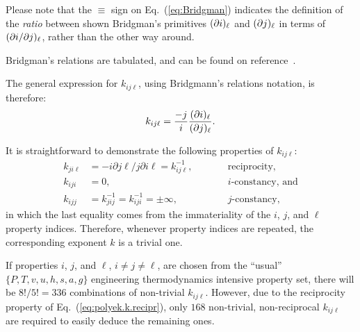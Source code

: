     Please note that the $\equiv$ sign on Eq.~(\ref{eq:Bridgman}) indicates  the  definition  of
    the \emph{ratio} between shown Bridgman's primitives $(\partial {{i}})_{{\ell}}$ and $(\partial {{j}})_{{\ell}}$ in  terms
    of $({\partial {{i}}}/{\partial {{j}}})_{{\ell}}$, rather than the other way around.

    Bridgman's relations are tabulated, and can be found on reference~\cite{2006-BejanA-Wiley}.

    The general expression for $k_{ij\ell}$, using Bridgmann's relations notation, is therefore:
    \begin{equation}
        k_{ij\ell} = \frac{-j}{i}\frac{(\partial {{i}})_{{\ell}}}{(\partial {{j}})_{{\ell}}}.
        \label{eq:k.bri}
    \end{equation}

    It is straightforward to demonstrate the following properties of $k_{ij\ell}$:
    \begin{align}
        \label{eq:polyek.k.recipr}
        k_{ji\ell}  &= -i\partial j\ell / j\partial i\ell = k_{ij\ell}^{-1},    & \qquad & \mbox{reciprocity,} \\
        \label{eq:polyek.k.consti}
        k_{iji}     &= 0,                                                       & \qquad & \mbox{$i$-constancy, and} \\
        \label{eq:polyek.k.constj}
        k_{ijj}     &= k_{jij}^{-1} = k_{iji}^{-1} = \pm\infty,                 & \qquad & \mbox{$j$-constancy},
    \end{align}
    \noindent in which the last equality comes from the  immateriality  of  the  $i$,  $j$,  and
    $\ell$  property  indices.  Therefore,  whenever  property   indices   are   repeated,   the
    corresponding exponent $k$ is a trivial one.

    If properties $i$, $j$, and $\ell$, $i \neq j \neq \ell$,  are  chosen  from  the  ``usual''
    $\{P, T, v, u, h, s, a, g\}$ engineering thermodynamics intensive property set,  there  will
    be $8!/5! = 336$ combinations of non-trivial $k_{ij\ell}$. However, due to  the  reciprocity
    property  of  Eq.~(\ref{eq:polyek.k.recipr}),   only   $168$   non-trivial,   non-reciprocal
    $k_{ij\ell}$ are required to easily deduce the remaining ones.


